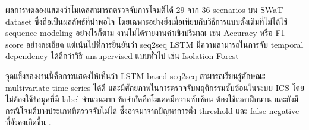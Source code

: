 ผลการทดลองแสดงว่าโมเดลสามารถตรวจจับการโจมตีได้ 29 จาก 36 scenarios บน SWaT dataset ซึ่งถือเป็นผลลัพธ์ที่น่าพอใจ โดยเฉพาะอย่างยิ่งเมื่อเทียบกับวิธีการแบบดั้งเดิมที่ไม่ได้ใช้ sequence modeling อย่างไรก็ตาม งานไม่ได้รายงานค่าเชิงปริมาณ เช่น Accuracy หรือ F1-score อย่างละเอียด แต่เน้นไปที่การยืนยันว่า seq2seq LSTM มีความสามารถในการจับ temporal dependency ได้ดีกว่าวิธี unsupervised แบบทั่วไป เช่น Isolation Forest

จุดแข็งของงานนี้คือการแสดงให้เห็นว่า LSTM-based seq2seq สามารถเรียนรู้ลักษณะ multivariate time-series ได้ดี และมีศักยภาพในการตรวจจับพฤติกรรมซับซ้อนในระบบ ICS โดยไม่ต้องใช้ข้อมูลที่มี label จำนวนมาก ข้อจำกัดคือโมเดลมีความซับซ้อน ต้องใช้เวลาฝึกนาน และยังมีกรณีโจมตีบางประเภทที่ตรวจจับไม่ได้ ซึ่งอาจมาจากปัญหาการตั้ง threshold และ false negative ที่ยังคงเกิดขึ้น \cite{ref13}.
